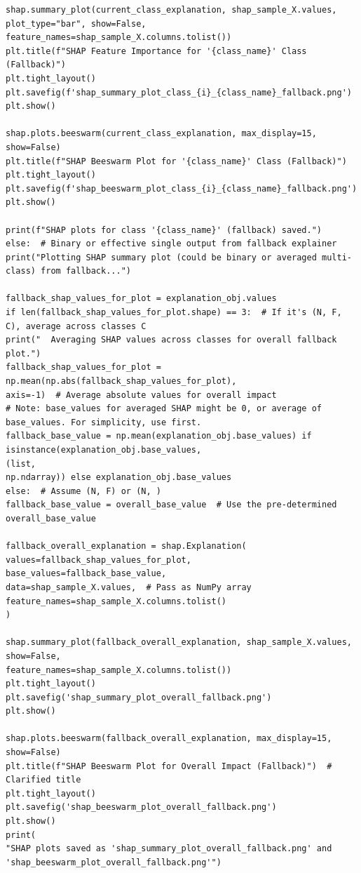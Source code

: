 \begin{lstlisting}[caption={Complete pipeline of XGBoost using CIC-IDS2017 in NIDS using Python}, label={lst:python-pipeline}]
shap.summary_plot(current_class_explanation, shap_sample_X.values, plot_type="bar", show=False,
feature_names=shap_sample_X.columns.tolist())
plt.title(f"SHAP Feature Importance for '{class_name}' Class (Fallback)")
plt.tight_layout()
plt.savefig(f'shap_summary_plot_class_{i}_{class_name}_fallback.png')
plt.show()

shap.plots.beeswarm(current_class_explanation, max_display=15, show=False)
plt.title(f"SHAP Beeswarm Plot for '{class_name}' Class (Fallback)")
plt.tight_layout()
plt.savefig(f'shap_beeswarm_plot_class_{i}_{class_name}_fallback.png')
plt.show()

print(f"SHAP plots for class '{class_name}' (fallback) saved.")
else:  # Binary or effective single output from fallback explainer
print("Plotting SHAP summary plot (could be binary or averaged multi-class) from fallback...")

fallback_shap_values_for_plot = explanation_obj.values
if len(fallback_shap_values_for_plot.shape) == 3:  # If it's (N, F, C), average across classes C
print("  Averaging SHAP values across classes for overall fallback plot.")
fallback_shap_values_for_plot = np.mean(np.abs(fallback_shap_values_for_plot),
axis=-1)  # Average absolute values for overall impact
# Note: base_values for averaged SHAP might be 0, or average of base_values. For simplicity, use first.
fallback_base_value = np.mean(explanation_obj.base_values) if isinstance(explanation_obj.base_values,
(list,
np.ndarray)) else explanation_obj.base_values
else:  # Assume (N, F) or (N, )
fallback_base_value = overall_base_value  # Use the pre-determined overall_base_value

fallback_overall_explanation = shap.Explanation(
values=fallback_shap_values_for_plot,
base_values=fallback_base_value,
data=shap_sample_X.values,  # Pass as NumPy array
feature_names=shap_sample_X.columns.tolist()
)

shap.summary_plot(fallback_overall_explanation, shap_sample_X.values, show=False,
feature_names=shap_sample_X.columns.tolist())
plt.tight_layout()
plt.savefig('shap_summary_plot_overall_fallback.png')
plt.show()

shap.plots.beeswarm(fallback_overall_explanation, max_display=15, show=False)
plt.title(f"SHAP Beeswarm Plot for Overall Impact (Fallback)")  # Clarified title
plt.tight_layout()
plt.savefig('shap_beeswarm_plot_overall_fallback.png')
plt.show()
print(
"SHAP plots saved as 'shap_summary_plot_overall_fallback.png' and 'shap_beeswarm_plot_overall_fallback.png'")


\end{lstlisting}
